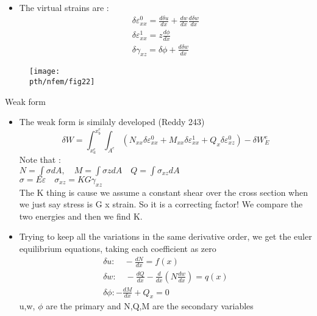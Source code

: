 	\begin{frame}
		\begin{itemize}
			\item The virtual strains are :
			\begin{equation}
				\begin{aligned}
					\delta \varepsilon_{xx}^0 = \frac{d\delta u}{dx} + \frac{dw}{dx}\frac{d\delta w}{dx} \\
					\delta \varepsilon^1_{xx} = z \frac{d\phi}{dx} \\
					\delta \gamma_{xz} = \delta \phi + \frac{d \delta w}{dx} 
				\end{aligned}
			\end{equation}	
		\end{itemize}
		\begin{figure}
			\centering
			\texttt{[image: \\pth/nfem/fig22]} 		
		\end{figure}
	\end{frame}


	\begin{frame}{Weak form}
		\begin{itemize}
			\item The weak form is similaly developed (Reddy 243)
			\begin{equation}
			 \delta W = \int_{x_a^e}^{x_b^e} \int_{A^e} \left(N_{xx} \delta \varepsilon_{xx}^0 + M_{xx}\delta\varepsilon_{xx}^1 + Q_x \delta\varepsilon_{xz}^0 \right) - \delta W_E^e
			\end{equation}
			Note that : \\
			$N = \int \sigma dA, \quad M =  \int \sigma z dA \quad Q =  \int \sigma_{xz}dA$ \\
			$\sigma =  E\varepsilon \quad \sigma_{xz} = KG\gamma_{xz}$
			\\
			The K thing is cause we assume a constant shear over the cross section when we just say stress is G x strain. So it is a correcting factor! We compare the two energies and then we find K.
			\item Trying to keep all the variations in the same derivative order, we get the euler equilibrium equations, taking each coefficient as zero
			\begin{equation}
				\begin{aligned}
					\delta u : \quad -\frac{dN}{dx} = f(x) \\
					\delta w : \quad -\frac{dQ}{dx}  - \frac{d}{dx}\left(N \frac{dw}{dx} \right) = q(x)\\
					\delta\phi : -\frac{dM}{dx} + Q_x = 0
				\end{aligned}
			\end{equation}
			u,w, $\phi$ are the primary and N,Q,M are the secondary variables
		\end{itemize}
	\end{frame}


